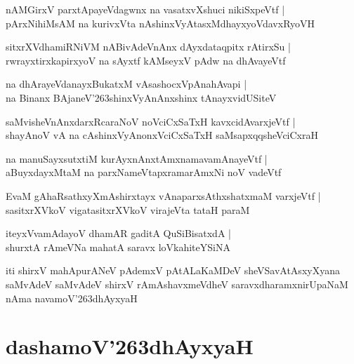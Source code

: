 \documentclass[twoside,12pt,openright]{book}
\def\S{\char'263}
\newcounter{shloka}[chapter]
\begin{document}
\begin{shloka}%
nAMGirxV parxtApayeVdagwnx na vasatxvXshuci nikiSxpeVtf |\\
pArxNihiMsAM na kurivxVta nAshinxVyAtasxMdhayxyoVdavxRyoVH 
\end{shloka}

\begin{shloka}%
sitxrXVdhamiRNiVM nABivAdeVnAnx dAyxdataqpitx rAtirxSu |\\
rwrayxtirxkapirxyoV na sAyxtf kAMseyxV pAdw na dhAvayeVtf
\end{shloka}

\begin{shloka}%
na dhArayeVdanayxBukatxM vAsashocxVpAnahAvapi |\\
na Binanx BAjaneV\S shinxVyAnAnxshinx tAnayxvidUSiteV
\end{shloka}

\begin{shloka}%
saMvisheVnAnxdarxRcaraNoV noVciCxSaTxH kavxcidAvarxjeVtf |\\
shayAnoV vA na cAshinxVyAnonxVciCxSaTxH saMsapxqqsheVciCxraH
\end{shloka}

\begin{shloka}%
na manuSayxsutxtiM kurAyxnAnxtAmxnamavamAnayeVtf |\\
aBuyxdayxMtaM na parxNameVtapxramarAmxNi noV vadeVtf 
\end{shloka}

\begin{shloka}%
EvaM gAhaRsathxyXmAshirxtayx vAnaparxsAthxshatxmaM varxjeVtf |\\
sasitxrXVkoV vigatasitxrXVkoV virajeVta tataH paraM 
\end{shloka}

\begin{shloka}%
iteyxVvamAdayoV dhamAR gaditA QuSiBisatxdA |\\
shurxtA rAmeVNa mahatA saravx loVkahiteYSiNA 
\end{shloka}

\begin{center}
iti shirxV mahApurANeV pAdemxV pAtALaKaMDeV sheVSavAtAsxyXyana saMvAdeV 
saMvAdeV shirxV rAmAshavxmeVdheV saravxdharamxnirUpaNaM nAma navamoV\S dhAyxyaH
\end{center}

\chapter{dashamoV\S dhAyxyaH}
\end{document}
